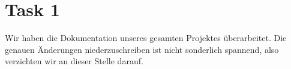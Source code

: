 \section{Task 1}
Wir haben die Dokumentation unseres gesamten Projektes überarbeitet. Die genauen Änderungen niederzuschreiben ist nicht sonderlich spannend, also verzichten wir an dieser Stelle darauf.